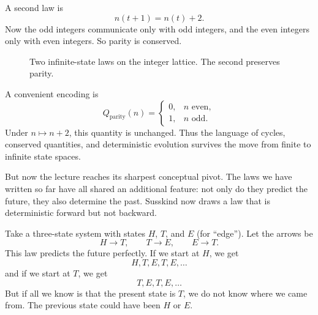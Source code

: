 A second law is
\begin{equation}
n(t+1)=n(t)+2.
\end{equation}
Now the odd integers communicate only with odd integers, and the even integers only with even integers. So parity is conserved.

\begin{figure}
\centering
{}

\vspace{0.8cm}

\caption{Two infinite-state laws on the integer lattice. The second preserves parity.}
\end{figure}

A convenient encoding is
\[
Q_{\mathrm{parity}}(n)=
\begin{cases}
0,& n \text{ even},\\[4pt]
1,& n \text{ odd}.
\end{cases}
\]
Under \(n\mapsto n+2\), this quantity is unchanged. Thus the language of cycles, conserved quantities, and deterministic evolution survives the move from finite to infinite state spaces.

But now the lecture reaches its sharpest conceptual pivot. The laws we have written so far have all shared an additional feature: not only do they predict the future, they also determine the past. Susskind now draws a law that is deterministic forward but not backward.

Take a three-state system with states \(H\), \(T\), and \(E\) (for ``edge''). Let the arrows be
\[
H\to T,\qquad T\to E,\qquad E\to T.
\]
This law predicts the future perfectly. If we start at \(H\), we get
\[
H,T,E,T,E,\dots
\]
and if we start at \(T\), we get
\[
T,E,T,E,\dots
\]
But if all we know is that the present state is \(T\), we do not know where we came from. The previous state could have been \(H\) or \(E\).

